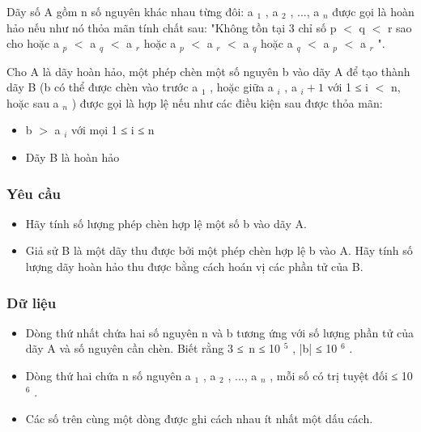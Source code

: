 



   Dãy số A gồm n số nguyên khác nhau từng đôi: a   $_    1   $   , a   $_    2   $   , ..., a   $_    n   $   được gọi là hoàn hảo nếu như nó thỏa mãn tính chất sau: "Không tồn tại 3 chỉ số p $<$ q $<$ r sao cho hoặc a   $_    p   $   $<$ a   $_    q   $   $<$ a   $_    r   $   hoặc a   $_    p   $   $<$ a   $_    r   $   $<$ a   $_    q   $   hoặc a   $_    q   $   $<$ a   $_    p   $   $<$ a   $_    r   $   ".  

   Cho A là dãy hoàn hảo, một phép chèn một số nguyên b vào dãy A để tạo thành dãy B (b có thể được chèn vào trước a   $_    1   $   , hoặc giữa a   $_    i   $   , a   $_    i+1   $   với 1 ≤ i $<$ n, hoặc sau a   $_    n   $   ) được gọi là hợp lệ nếu như các điều kiện sau được thỏa mãn:  
\begin{itemize}
	\item     b $>$ a    $_     i    $    với mọi 1 ≤ i ≤ n   
	\item     Dãy B là hoàn hảo   
\end{itemize}
\begin{itemize}
\end{itemize}

\subsubsection{   Yêu cầu  }
\begin{itemize}
	\item     Hãy tính số lượng phép chèn hợp lệ một số b vào dãy A.   
	\item     Giả sử B là một dãy thu được bởi một phép chèn hợp lệ b vào A. Hãy tính số lượng dãy hoàn hảo thu được bằng cách hoán vị các phần tử của B.   
\end{itemize}

\subsubsection{   Dữ liệu  }
\begin{itemize}
	\item     Dòng thứ nhất chứa hai số nguyên n và b tương ứng với số lượng phần tử của dãy A và số nguyên cần chèn. Biết rằng 3 ≤ n ≤ 10    $^     5    $    , |b| ≤ 10    $^     6    $    .   
	\item     Dòng thứ hai chứa n số nguyên a    $_     1    $    , a    $_     2    $    , ..., a    $_     n    $    , mỗi số có trị tuyệt đối ≤ 10    $^     6    $    .   
	\item     Các số trên cùng một dòng được ghi cách nhau ít nhất một dấu cách.   
\end{itemize}

